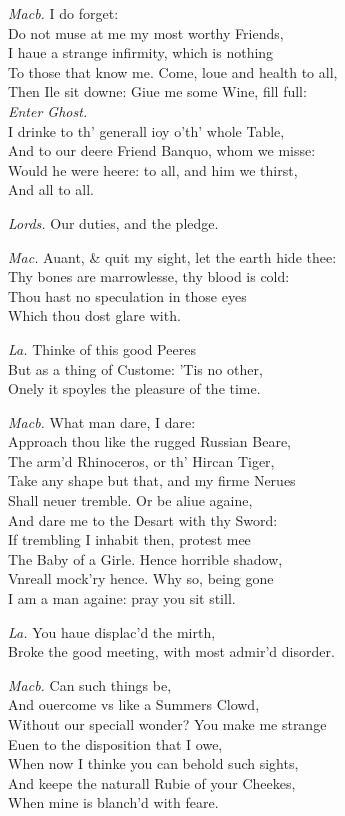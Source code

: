 \documentclass[12pt]{sides}
\newcommand{\clStageDir}[1]{\hspace*{\fill}\textit{#1}\hspace*{\fill}}
\newcommand{\dia}[1]{\hskip 15pt\textit{#1}\hskip 6pt}
\begin{document}
\begin{multicols}{2}
            \dia{Macb.} I do forget: \\ Do not muse at me my most worthy Friends, \\ I haue a strange infirmity, which is nothing \\ To those that know me. Come, loue and health to all, \\ Then Ile sit downe: Giue me some Wine, fill full: \\ \clStageDir{Enter Ghost.} \\ I drinke to th' generall ioy o'th' whole Table, \\ And to our deere Friend Banquo, whom we misse: \\ Would he were heere: to all, and him we thirst, \\ And all to all.

            \dia{Lords.} Our duties, and the pledge.

            \dia{Mac.} Auant, \& quit my sight, let the earth hide thee: \\ Thy bones are marrowlesse, thy blood is cold: \\ Thou hast no speculation in those eyes \\ Which thou dost glare with.

            \dia{La.} Thinke of this good Peeres \\ But as a thing of Custome: 'Tis no other, \\ Onely it spoyles the pleasure of the time.

            \dia{Macb.} What man dare, I dare: \\ Approach thou like the rugged Russian Beare, \\ The arm'd Rhinoceros, or th' Hircan Tiger, \\ Take any shape but that, and my firme Nerues \\ Shall neuer tremble. Or be aliue againe, \\ And dare me to the Desart with thy Sword: \\ If trembling I inhabit then, protest mee \\ The Baby of a Girle. Hence horrible shadow, \\ Vnreall mock'ry hence. Why so, being gone \\ I am a man againe: pray you sit still.

            \dia{La.} You haue displac'd the mirth, \\ Broke the good meeting, with most admir'd disorder.

            \dia{Macb.} Can such things be, \\ And ouercome vs like a Summers Clowd, \\ Without our speciall wonder? You make me strange \\ Euen to the disposition that I owe, \\ When now I thinke you can behold such sights, \\ And keepe the naturall Rubie of your Cheekes, \\ When mine is blanch'd with feare.


\end{multicols}
\end{document}
